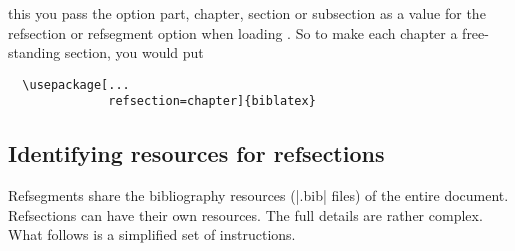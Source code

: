 \begin{enumerate}
  this you pass the option part, chapter, section or subsection as a
  value for the refsection or refsegment option when loading \biblatex.
  So to make each chapter a free-standing section, you would put
  \begin{marginfigure}
  \end{marginfigure}
\begin{Verbatim}
  \usepackage[...
              refsection=chapter]{biblatex}
\end{Verbatim}
\end{enumerate}

\subsection{Identifying resources for refsections}

Refsegments share the bibliography resources (|.bib| files) of the
entire document. Refsections can have their own resources. The full
details are rather complex. What follows is a simplified set of
instructions.

